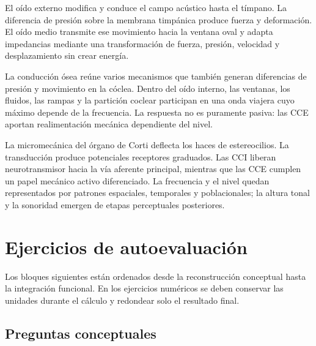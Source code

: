 El oído externo modifica y conduce el campo acústico hasta el tímpano. La
diferencia de presión sobre la membrana timpánica produce fuerza y
deformación. El oído medio transmite ese movimiento hacia la ventana oval y
adapta impedancias mediante una transformación de fuerza, presión, velocidad
y desplazamiento sin crear energía.

La conducción ósea reúne varios mecanismos que también generan diferencias de
presión y movimiento en la cóclea. Dentro del oído interno, las ventanas, los
fluidos, las rampas y la partición coclear participan en una onda viajera cuyo
máximo depende de la frecuencia. La respuesta no es puramente pasiva: las CCE
aportan realimentación mecánica dependiente del nivel.

La micromecánica del órgano de Corti deflecta los haces de estereocilios. La
transducción produce potenciales receptores graduados. Las CCI liberan
neurotransmisor hacia la vía aferente principal, mientras que las CCE cumplen
un papel mecánico activo diferenciado. La frecuencia y el nivel quedan
representados por patrones espaciales, temporales y poblacionales; la altura
tonal y la sonoridad emergen de etapas perceptuales posteriores.

\section{Ejercicios de autoevaluación}
\label{sec:u6-ejercicios}

Los bloques siguientes están ordenados desde la reconstrucción conceptual
hasta la integración funcional. En los ejercicios numéricos se deben
conservar las unidades durante el cálculo y redondear solo el resultado final.

\subsection*{Preguntas conceptuales}

